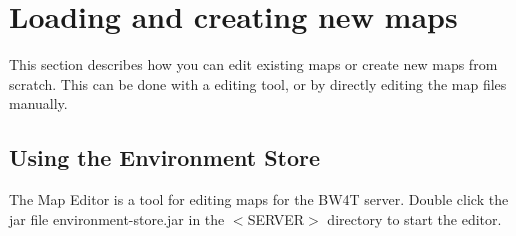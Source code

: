 \newpage

\section{Loading and creating new maps}
This section describes how you can edit existing maps or create new maps from scratch. This can be done with a editing tool, or by directly editing the map files manually.

\subsection{Using the Environment Store}
The Map Editor is a tool for editing maps for the BW4T server. Double click the jar file environment-store.jar  in the $<$SERVER$>$ directory to start the  editor.

